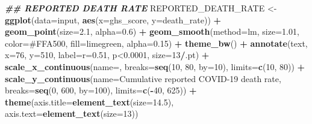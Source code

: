 \documentclass[
]{article}
\newenvironment{Shaded}{\begin{snugshade}}{\end{snugshade}}
\newcommand{\AttributeTok}[1]{\textcolor[rgb]{0.13,0.29,0.53}{#1}}
\newcommand{\DecValTok}[1]{\textcolor[rgb]{0.00,0.00,0.81}{#1}}
\newcommand{\DocumentationTok}[1]{\textcolor[rgb]{0.56,0.35,0.01}{\textbf{\textit{#1}}}}
\newcommand{\FloatTok}[1]{\textcolor[rgb]{0.00,0.00,0.81}{#1}}
\newcommand{\FunctionTok}[1]{\textcolor[rgb]{0.13,0.29,0.53}{\textbf{#1}}}
\newcommand{\NormalTok}[1]{#1}
\newcommand{\OtherTok}[1]{\textcolor[rgb]{0.56,0.35,0.01}{#1}}
\newcommand{\SpecialCharTok}[1]{\textcolor[rgb]{0.81,0.36,0.00}{\textbf{#1}}}
\newcommand{\StringTok}[1]{\textcolor[rgb]{0.31,0.60,0.02}{#1}}
\begin{document}
\begin{Shaded}
\begin{Highlighting}[]
\DocumentationTok{\#\# REPORTED DEATH RATE}
\NormalTok{REPORTED\_DEATH\_RATE }\OtherTok{\textless{}{-}}\FunctionTok{ggplot}\NormalTok{(}\AttributeTok{data=}\NormalTok{input, }\FunctionTok{aes}\NormalTok{(}\AttributeTok{x=}\NormalTok{ghs\_score, }\AttributeTok{y=}\NormalTok{death\_rate)) }\SpecialCharTok{+}
  \FunctionTok{geom\_point}\NormalTok{(}\AttributeTok{size=}\FloatTok{2.1}\NormalTok{, }\AttributeTok{alpha=}\FloatTok{0.6}\NormalTok{) }\SpecialCharTok{+}
  \FunctionTok{geom\_smooth}\NormalTok{(}\AttributeTok{method=}\StringTok{\textquotesingle{}lm\textquotesingle{}}\NormalTok{, }\AttributeTok{size=}\FloatTok{1.01}\NormalTok{, }\AttributeTok{color=}\StringTok{\textquotesingle{}\#FFA500\textquotesingle{}}\NormalTok{, }\AttributeTok{fill=}\StringTok{\textquotesingle{}limegreen\textquotesingle{}}\NormalTok{, }\AttributeTok{alpha=}\FloatTok{0.15}\NormalTok{) }\SpecialCharTok{+}
  \FunctionTok{theme\_bw}\NormalTok{() }\SpecialCharTok{+} \FunctionTok{annotate}\NormalTok{(}\StringTok{\textquotesingle{}text\textquotesingle{}}\NormalTok{, }\AttributeTok{x=}\DecValTok{76}\NormalTok{, }\AttributeTok{y=}\DecValTok{510}\NormalTok{, }\AttributeTok{label=}\StringTok{\textquotesingle{}r=0.51, p\textless{}0.0001\textquotesingle{}}\NormalTok{, }\AttributeTok{size=}\DecValTok{13}\SpecialCharTok{/}\NormalTok{.pt) }\SpecialCharTok{+}
  \FunctionTok{scale\_x\_continuous}\NormalTok{(}\AttributeTok{name=}\StringTok{\textquotesingle{}\textquotesingle{}}\NormalTok{, }\AttributeTok{breaks=}\FunctionTok{seq}\NormalTok{(}\DecValTok{10}\NormalTok{, }\DecValTok{80}\NormalTok{, }\AttributeTok{by=}\DecValTok{10}\NormalTok{), }\AttributeTok{limits=}\FunctionTok{c}\NormalTok{(}\DecValTok{10}\NormalTok{, }\DecValTok{80}\NormalTok{)) }\SpecialCharTok{+}
  \FunctionTok{scale\_y\_continuous}\NormalTok{(}\AttributeTok{name=}\StringTok{\textquotesingle{}Cumulative reported COVID{-}19 death rate\textquotesingle{}}\NormalTok{, }\AttributeTok{breaks=}\FunctionTok{seq}\NormalTok{(}\DecValTok{0}\NormalTok{, }\DecValTok{600}\NormalTok{, }\AttributeTok{by=}\DecValTok{100}\NormalTok{), }\AttributeTok{limits=}\FunctionTok{c}\NormalTok{(}\SpecialCharTok{{-}}\DecValTok{40}\NormalTok{, }\DecValTok{625}\NormalTok{)) }\SpecialCharTok{+}
  \FunctionTok{theme}\NormalTok{(}\AttributeTok{axis.title=}\FunctionTok{element\_text}\NormalTok{(}\AttributeTok{size=}\FloatTok{14.5}\NormalTok{), }\AttributeTok{axis.text=}\FunctionTok{element\_text}\NormalTok{(}\AttributeTok{size=}\DecValTok{13}\NormalTok{))}
\end{Highlighting}
\end{Shaded}
\end{document}
